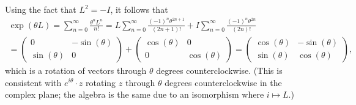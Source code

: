 \documentclass[11pt]{article}
\begin{document}
\begin{enumerate}[label=14.\arabic*]
\begin{enumerate}[label = (\alph*)]
        Using the fact that $L^2 = -I$, it follows that \begin{multline*}
            \exp(\theta L) = \sum_{n=0}^{\infty} \frac{\theta^n L^n}{n!} = L\sum_{n = 0}^{\infty}\frac{(-1)^n\theta^{2n+1}}{(2n+1)!} + I\sum_{n=0}^{\infty}\frac{(-1)^n\theta^{2n}}{(2n)!} \\ = \begin{pmatrix}
                0 & -\sin(\theta)\\\sin(\theta) & 0
             \end{pmatrix} + \begin{pmatrix}
                \cos(\theta) & 0\\0 & \cos(\theta)
             \end{pmatrix} = \begin{pmatrix}
                 \cos(\theta) & -\sin(\theta)\\\sin(\theta) &  \cos(\theta)
             \end{pmatrix},
        \end{multline*}
        which is a rotation of vectors through $\theta$ degrees counterclockwise. (This is consistent with $e^{i\theta} \cdot z$ rotating $z$ through $\theta$ degrees counterclockwise in the complex plane; the algebra is the same due to an isomorphism where $i\mapsto L$.)
    \end{enumerate}
\end{enumerate}
\end{document}
